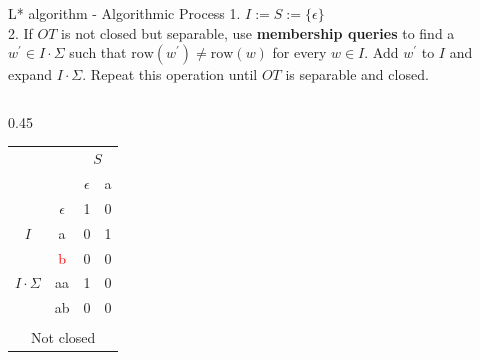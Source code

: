 \documentclass{beamer}
\begin{document}
\begin{frame}{L* algorithm - Algorithmic Process}
    1. $I:= S := \{\epsilon\}$\\
    2. If $OT$ is not closed but separable, use \textbf{membership queries} to find a
    $w^{\prime} \in I \cdot \Sigma$ such that
    $\text{row}(w^{\prime}) \ne \text{row}(w)$ for every $w \in I$.
    Add $w^{\prime}$ to $I$ and expand $I \cdot \Sigma$.
    Repeat this operation until $OT$ is separable and closed.\\
    
    \begin{columns}[T]
        \begin{column}{0.45\textwidth} 
            \centering
            \begin{tabular}{cc|c|c}
                &   & \multicolumn{2}{c}{$S$} \\ 
                \multicolumn{2}{c|}{} & $\epsilon$ & a \\ \hline
                & $\epsilon$ & 1 & 0 \\
                {$I$}& a          & 0 & 1 \\ \hline
                 & \textcolor{red}{b}          & 0 & 0 \\
                {$I \cdot \Sigma$}           & aa& 1& 0 \\
                & ab& 0&0\\ 
                \multicolumn{4}{c}{} \\[-0.8em] 
                \multicolumn{4}{c}{\footnotesize Not closed}
            \end{tabular}
        \end{column}
    

\end{columns}
\end{frame}
\end{document}
